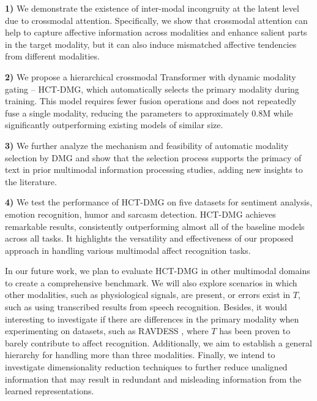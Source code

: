 \documentclass[11pt,a4paper]{article}
\begin{document}
\textbf{1)} We demonstrate the existence of inter-modal incongruity at the latent level due to crossmodal attention. Specifically, we show that crossmodal attention can help to capture affective information across modalities and enhance salient parts in the target modality, but it can also induce mismatched affective tendencies from different modalities.

\textbf{2)} We propose a hierarchical crossmodal Transformer with dynamic modality gating -- HCT-DMG, which automatically selects the primary modality during training. This model requires fewer fusion operations and does not repeatedly fuse a single modality, reducing the parameters to approximately 0.8M while significantly outperforming existing models of similar size.

\textbf{3)} We further analyze the mechanism and feasibility of automatic modality selection by DMG and show that the selection process supports the primacy of text in prior multimodal information processing studies, adding new insights to the literature.

\textbf{4)} We test the performance of HCT-DMG on five datasets for sentiment analysis, emotion recognition, humor and sarcasm detection. HCT-DMG achieves remarkable results, consistently outperforming almost all of the baseline models across all tasks. It highlights the versatility and effectiveness of our proposed approach in handling various multimodal affect recognition tasks. 

In our future work, we plan to evaluate HCT-DMG in other multimodal domains to create a comprehensive benchmark. We will also explore scenarios in which other modalities, such as physiological signals, are present, or errors exist in $T$, such as using transcribed results from speech recognition. Besides, it would interesting to investigate if there are differences in the primary modality when experimenting on datasets, such as RAVDESS \citep{livingstone2018ryerson}, where $T$ has been proven to barely contribute to affect recognition. Additionally, we aim to establish a general hierarchy for handling more than three modalities. Finally, we intend to investigate dimensionality reduction techniques \citep{shao2023erasure} to further reduce unaligned information that may result in redundant and misleading information from the learned representations.
\end{document}

